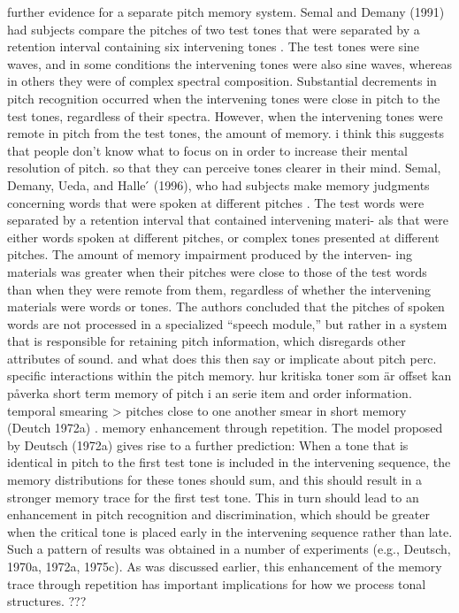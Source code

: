 further evidence for a separate pitch memory system. Semal and Demany (1991) had subjects compare the pitches of two test tones that were separated by a retention interval containing six intervening tones \cite{semal1991dissociation}. The test tones were sine waves, and in some conditions the intervening tones were also sine waves, whereas in others they were of complex spectral composition. Substantial decrements in pitch recognition occurred when the intervening tones were close in pitch to the test tones, regardless of their spectra. However, when the intervening tones were remote in pitch from the test tones, the amount of memory. i think this suggests that people don't know what to focus on in order to increase their mental resolution of pitch. so that they can perceive tones clearer in their mind. Semal, Demany, Ueda, and Halle ́ (1996), who had subjects make memory judgments concerning words that were spoken at different pitches \cite{semal1996speech}. The test words were separated by a retention interval that contained intervening materi- als that were either words spoken at different pitches, or complex tones presented at different pitches. The amount of memory impairment produced by the interven- ing materials was greater when their pitches were close to those of the test words than when they were remote from them, regardless of whether the intervening materials were words or tones. The authors concluded that the pitches of spoken words are not processed in a specialized “speech module,” but rather in a system that is responsible for retaining pitch information, which disregards other attributes of sound. and what does this then  say or implicate about pitch perc.
specific interactions within the pitch memory. hur kritiska toner som är offset kan påverka short term memory of pitch i an serie
item and order information. temporal smearing > pitches close to one another smear in short memory (Deutch 1972a) \cite{deutsch1972effect}.
memory enhancement through repetition. The model proposed by Deutsch (1972a) gives rise to a further prediction: When a tone that is identical in pitch to the first test tone is included in the intervening sequence, the memory distributions for these tones should sum, and this should result in a stronger memory trace for the first test tone. This in turn should lead to an enhancement in pitch recognition and discrimination, which should be greater when the critical tone is placed early in the intervening sequence rather than late. Such a pattern of results was obtained in a number of experiments \cite{deutsch1970dislocation} \cite{deutsch1972effect} \cite{deutsch1975organization} (e.g., Deutsch, 1970a, 1972a, 1975c). As was discussed earlier, this enhancement of the memory trace through repetition has important implications for how we process tonal structures. ???
